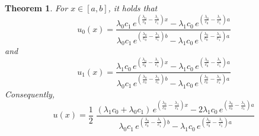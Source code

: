 \documentclass{article}
\newtheorem{thm}{Theorem}
\begin{document}
\begin{thm}\label{thm:driftu}For $x\in[a,b]$, it holds that 
\begin{equation}u_0(x)=\frac{\lambda_0c_1\,e^{\left(\frac{\lambda_0}{c_0}-\frac{\lambda_1}{c_1}\right)x}-\lambda_1c_0\,e^{\left(\frac{\lambda_0}{c_0}-\frac{\lambda_1}{c_1}\right)a}}{\lambda_0c_1\,e^{\left(\frac{\lambda_0}{c_0}-\frac{\lambda_1}{c_1}\right)b}-\lambda_1c_0\,e^{\left(\frac{\lambda_0}{c_0}-\frac{\lambda_1}{c_1}\right)a}}\label{u_0sol_drift}\end{equation}
and
\begin{equation}u_1(x)=\frac{\lambda_1c_0\,e^{\left(\frac{\lambda_0}{c_0}-\frac{\lambda_1}{c_1}\right)x}-\lambda_1c_0\,e^{\left(\frac{\lambda_0}{c_0}-\frac{\lambda_1}{c_1}\right)a}}{\lambda_0c_1\,e^{\left(\frac{\lambda_0}{c_0}-\frac{\lambda_1}{c_1}\right)b}-\lambda_1c_0\,e^{\left(\frac{\lambda_0}{c_0}-\frac{\lambda_1}{c_1}\right)a}}\label{u_1sol_drift}\end{equation}
Consequently,
\begin{equation}u(x)=\frac{1}{2}\;\frac{(\lambda_1c_0+\lambda_0c_1)\,e^{\left(\frac{\lambda_0}{c_0}-\frac{\lambda_1}{c_1}\right)x}-2\lambda_1c_0\,e^{\left(\frac{\lambda_0}{c_0}-\frac{\lambda_1}{c_1}\right)a}}{\lambda_0c_1\,e^{\left(\frac{\lambda_0}{c_0}-\frac{\lambda_1}{c_1}\right)b}-\lambda_1c_0\,e^{\left(\frac{\lambda_0}{c_0}-\frac{\lambda_1}{c_1}\right)a}}\label{u_totsol_drift}\end{equation}
\end{thm}
\end{document}

